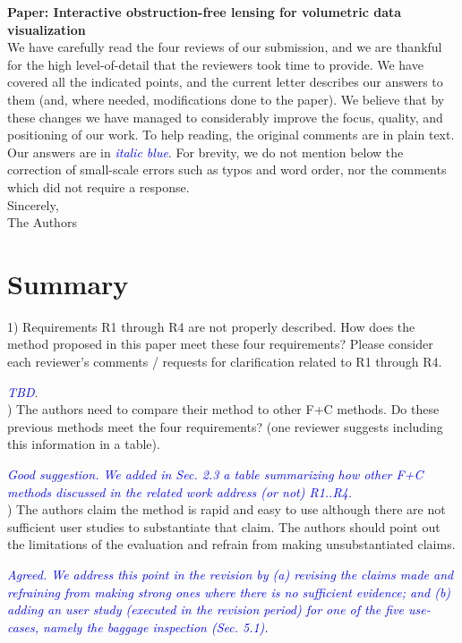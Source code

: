\documentclass[a4paper,10pt]{article}
\newcommand{\rr}[1]{\emph{\textcolor{blue}{#1}}}
\begin{document}
\noindent\textbf{Paper: Interactive obstruction-free lensing for volumetric data visualization}\\

We have carefully read the four reviews of our submission, and we are thankful for the high level-of-detail that the reviewers took time to provide. We have covered all the
indicated points, and the current letter describes our answers to them (and, where needed, modifications done to the paper). We believe that by these changes we have managed to considerably improve the focus, quality, and positioning
of our work. To help reading, the original comments are in plain text. Our answers are in \rr{italic blue}. For brevity, we do not mention below the correction of small-scale errors such as typos and word order, nor the comments which did not require a response.\\

\noindent Sincerely,\\
The Authors\\


\section{Summary}


    1) Requirements R1 through R4 are not properly described. How does the method
    proposed in this paper meet these four requirements? Please consider each
    reviewer's comments / requests for clarification related to R1 through R4.
    
    \rr{TBD}.\\

) The authors need to compare their method to other F+C methods. Do these
    previous methods meet the four requirements? (one reviewer suggests including this
    information in a table).
    
    \rr{Good suggestion. We added in Sec. 2.3 a table summarizing how other F+C methods discussed in the related work address (or not) R1..R4.}\\

) The authors claim the method is rapid and easy to use although there are not sufficient user studies to substantiate that claim. The authors should point out the limitations of the evaluation and refrain from making unsubstantiated claims.

   \rr{Agreed. We address this point in the revision by (a) revising the claims made and refraining from making strong ones where there is no sufficient evidence; and (b) adding an user study (executed in the revision period) for one of the five use-cases, namely the baggage inspection (Sec. 5.1).}\\
\end{document}
